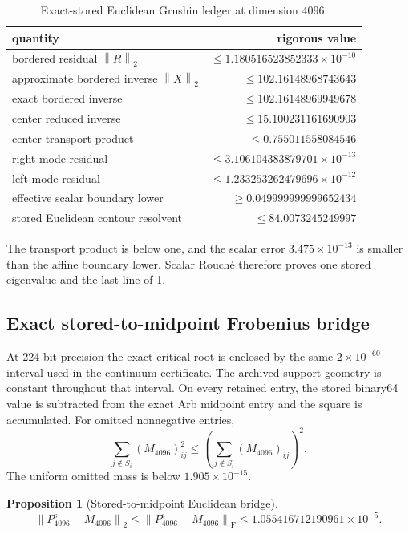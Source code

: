 \documentclass[11pt]{article}
\newtheorem{proposition}[theorem]{Proposition}
\theoremstyle{definition}
\theoremstyle{remark}
\newcommand{\norm}[1]{\left\lVert #1\right\rVert}
\begin{document}
\begin{table}[H]
\centering
\caption{Exact-stored Euclidean Grushin ledger at dimension $4096$.}
\label{tab:grushin}
\begin{tabular}{@{}lr@{}}
\toprule
quantity & rigorous value\\
\midrule
bordered residual $\norm R_2$
 & $\le1.180516523852333\times10^{-10}$\\
approximate bordered inverse $\norm X_2$
 & $\le102.16148968743643$\\
exact bordered inverse
 & $\le102.16148969949678$\\
center reduced inverse
 & $\le15.100231161690903$\\
center transport product
 & $\le0.755011558084546$\\
right mode residual
 & $\le3.106104383879701\times10^{-13}$\\
left mode residual
 & $\le1.233253262479696\times10^{-12}$\\
effective scalar boundary lower
 & $\ge0.049999999999652434$\\
stored Euclidean contour resolvent
 & $\le84.0073245249997$\\
\bottomrule
\end{tabular}
\end{table}

The transport product is below one, and the scalar error
$3.475\times10^{-13}$ is smaller than the affine boundary lower.  Scalar
Rouch\'e \citep{Ahlfors1979,SjoestrandZworski2007} therefore proves one
stored eigenvalue and the last line of
\cref{tab:grushin}.

\subsection{Exact stored-to-midpoint Frobenius bridge}

At 224-bit precision \citep{Johansson2017} the exact critical root is
enclosed by the same
$2\times10^{-60}$ interval used in the continuum certificate.  The archived
support geometry is constant throughout that interval.  On every retained
entry, the stored binary64 value is subtracted from the exact Arb midpoint
entry and the square is accumulated.  For omitted nonnegative entries,
\[
 \sum_{j\notin S_i}(M_{4096})_{ij}^2
 \le
 \left(\sum_{j\notin S_i}(M_{4096})_{ij}\right)^2.
\]
The uniform omitted mass is below
$1.905\times10^{-15}$.

\begin{proposition}[Stored-to-midpoint Euclidean bridge]
\label{prop:stored-midpoint}
\[
 \norm{P_{4096}^{\mathrm s}-M_{4096}}_2
 \le
 \norm{P_{4096}^{\mathrm s}-M_{4096}}_{\mathrm F}
 \le1.055416712190961\times10^{-5}.
 \label{eq:stored-midpoint-defect}
\]
\end{proposition}
\end{document}
